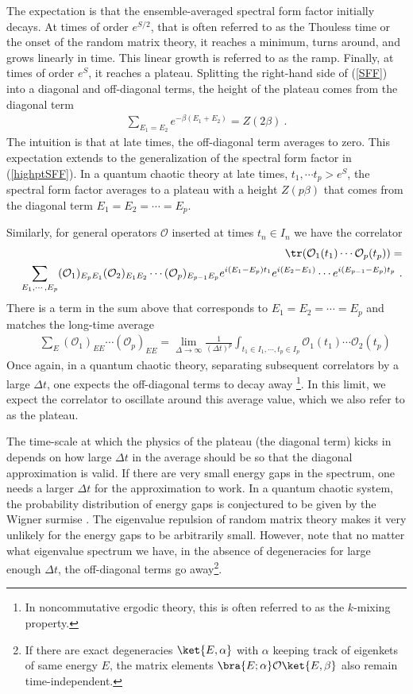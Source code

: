 \documentclass[a4paper,11pt]{article}
\theoremstyle{definition}
\numberwithin{equation}{section}
\newcommand{\mO}{\mathcal{O}}
\newcommand{\nn}{\nonumber}
\begin{document}
The expectation is that the ensemble-averaged spectral form factor initially decays. At times of order $e^{S/2}$, that is often referred to as the Thouless time or the onset of the random matrix theory, it reaches a minimum, turns around, and grows linearly in time. This linear growth is referred to as the ramp. Finally, at times of order $e^S$, it reaches a plateau. Splitting the right-hand side of (\ref{SFF}) into a diagonal and off-diagonal terms, the height of the plateau comes from the diagonal term \cite{prange1997spectral,saad2019late}
\begin{eqnarray}
    \sum_{E_1=E_2}e^{-\beta (E_1+E_2)}=Z(2\beta)\ .
\end{eqnarray}
The intuition is that at late times, the off-diagonal term averages to zero. This expectation extends to the generalization of the spectral form factor in (\ref{highptSFF}). In a quantum chaotic theory at late times, $t_1,\cdots t_p>e^S$, the spectral form factor averages to a plateau with a height $Z(p\beta)$ that comes from the diagonal term $E_1=E_2=\cdots=E_p$.

Similarly, for general operators $\mO$ inserted at times $t_n\in I_n$ we have the correlator
\begin{eqnarray}
&&\tr(\mO_1(t_1)\cdots \mO_p(t_p))=\nn\\
&&\sum_{E_1,\cdots, E_p}(\mO_1)_{E_pE_1}(\mO_2)_{E_1E_2}\cdots (\mO_p)_{E_{p-1}E_p}e^{i(E_1-E_p)t_1}e^{i(E_2-E_1)}\cdots e^{i(E_{p-1}-E_p)t_p} \ .
\end{eqnarray}
There is a term in the sum above that corresponds to $E_1=E_2=\cdots=E_p$ and matches the long-time average
\begin{eqnarray}
&&\sum_E (\mO_1)_{EE}\cdots (\mO_p)_{EE}=\lim_{\Delta \to \infty}\frac{1}{(\Delta t)^p}\int_{t_1\in I_1,\cdots, t_p\in I_p}\mO_1(t_1)\cdots \mO_2(t_p)
\end{eqnarray}
Once again, in a quantum chaotic theory, separating subsequent correlators by a large $\Delta t$, one expects the off-diagonal terms to decay away \footnote{In noncommutative ergodic theory, this is often referred to as the $k$-mixing property.}. In this limit, we expect the correlator to oscillate around this average value, which we also refer to as the plateau.

The time-scale at which the physics of the plateau (the diagonal term) kicks in depends on how large $\Delta t$ in the average should be so that the diagonal approximation is valid. If there are very small energy gaps in the spectrum, one needs a larger $\Delta t$ for the approximation to work. In a quantum chaotic system, the probability distribution of energy gaps is conjectured to be given by the Wigner surmise \cite{mehta2004random}. The eigenvalue repulsion of random matrix theory makes it very unlikely for the energy gaps to be arbitrarily small. However,  note that no matter what eigenvalue spectrum we have, in the absence of degeneracies for large enough $\Delta t$, the off-diagonal terms go away\footnote{If there are exact degeneracies $\ket{E,\alpha}$ with $\alpha$ keeping track of eigenkets of same energy $E$, the matrix elements $\bra{E;\alpha}\mO\ket{E,\beta}$ also remain time-independent.}.
\end{document}
